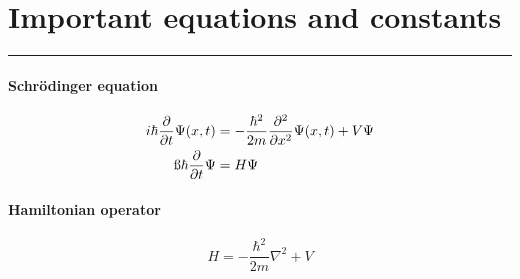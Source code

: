 \section*{Important equations and constants}
\vspace{-15pt}\noindent\rule{\textwidth}{0.1pt}\vspace{-10pt}
    \paragraph{Schrödinger equation}
    \begin{align*}
        i\hbar\dfrac{\partial}{\partial t}\Psi(x,t) &= -\frac{\hbar^2}{2m}\frac{\partial^2}{\partial x ^2}\Psi(x,t)+V\Psi \\
        \i\hbar\dfrac{\partial}{\partial t}\Psi &= H\Psi\\
    \end{align*}
    \paragraph{Hamiltonian operator}
    \[
        H = -\dfrac{\hbar^2}{2m}\nabla^2 +V
    \]
    